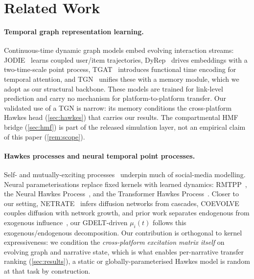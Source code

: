 \documentclass[11pt]{article}
\begin{document}
\section{Related Work}
\label{sec:related}

\paragraph{Temporal graph representation learning.}
Continuous-time dynamic graph models embed evolving interaction streams:
JODIE~\citep{kumar2019predicting} learns coupled user/item trajectories,
DyRep~\citep{trivedi2019dyrep} drives embeddings with a two-time-scale point
process, TGAT~\citep{xu2020tgat} introduces functional time encoding for
temporal attention, and TGN~\citep{rossi2020temporal} unifies these with a
memory module, which we adopt as our structural backbone. These models are
trained for link-level prediction and carry no mechanism for platform-to-platform
transfer. Our validated use of a TGN is narrow: its memory conditions the
cross-platform Hawkes head (\cref{sec:hawkes}) that carries our results. The
compartmental HMF bridge (\cref{sec:hmf}) is part of the released simulation
layer, not an empirical claim of this paper (\cref{rem:scope}).

\paragraph{Hawkes processes and neural temporal point processes.}
Self- and mutually-exciting processes~\citep{hawkes1971spectra} underpin much of
social-media modelling. Neural parameterisations replace fixed kernels with
learned dynamics: RMTPP~\citep{du2016rmtpp}, the Neural Hawkes
Process~\citep{mei2017neural}, and the Transformer Hawkes
Process~\citep{zuo2020transformer}. Closer to our setting,
NETRATE~\citep{gomez2011netrate} infers diffusion networks from cascades,
COEVOLVE~\citep{farajtabar2017coevolve} couples diffusion with network growth,
and prior work separates endogenous from exogenous
influence~\citep{myers2012external}, our GDELT-driven $\mu_i(t)$ follows
this exogenous/endogenous decomposition.
Our contribution is orthogonal to kernel expressiveness: we condition the
\emph{cross-platform excitation matrix itself} on evolving graph and narrative
state, which is what enables per-narrative transfer ranking
(\cref{sec:results}), a static or globally-parameterised Hawkes model is
random at that task by construction.
\end{document}
